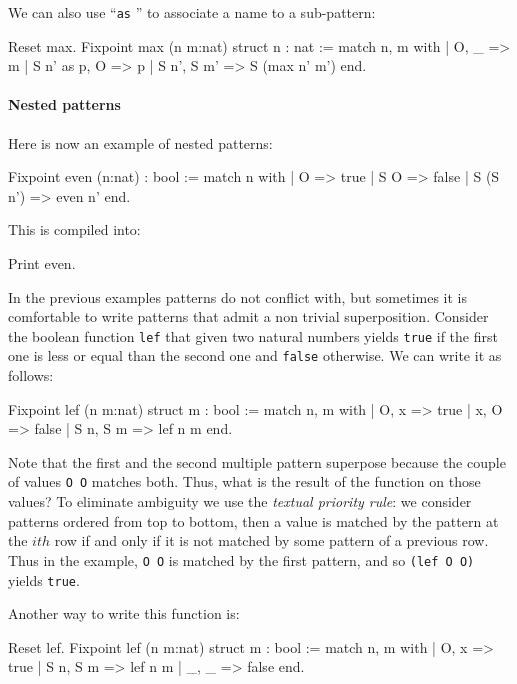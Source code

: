 We can also use ``\texttt{as} {\ident}'' to associate a name to a
sub-pattern:

\begin{coq_example}
Reset max.
Fixpoint max (n m:nat) {struct n} : nat :=
  match n, m with
  | O, _ => m
  | S n' as p, O => p
  | S n', S m' => S (max n' m')
  end.
\end{coq_example}

\paragraph{Nested patterns}

Here is now an example of nested patterns:

\begin{coq_example}
Fixpoint even (n:nat) : bool :=
  match n with
  | O => true
  | S O => false
  | S (S n') => even n'
  end.
\end{coq_example}

This is compiled into:

\begin{coq_example}
Print even.
\end{coq_example}

In the previous examples patterns do not conflict with, but
sometimes it is comfortable to write patterns that admit a non
trivial superposition. Consider
the boolean function \texttt{lef} that given two natural numbers
yields \texttt{true} if the first one is less or equal than the second
one and \texttt{false} otherwise. We can write it as follows:

\begin{coq_example}
Fixpoint lef (n m:nat) {struct m} : bool :=
  match n, m with
  | O, x => true
  | x, O => false
  | S n, S m => lef n m
  end.
\end{coq_example}

Note that the first and the second multiple pattern superpose because
the couple of values \texttt{O O} matches both. Thus, what is the result
of the function on those values?  To eliminate ambiguity we use the
{\em textual priority rule}: we consider patterns ordered from top to
bottom, then a value is matched by the pattern at the $ith$ row if and
only if it is not matched by some pattern of a previous row. Thus in the
example,
\texttt{O O} is matched by the first pattern, and so \texttt{(lef O O)}
yields \texttt{true}.

Another way to write  this function is:

\begin{coq_example}
Reset lef.
Fixpoint lef (n m:nat) {struct m} : bool :=
  match n, m with
  | O, x => true
  | S n, S m => lef n m
  | _, _ => false
  end.
\end{coq_example}

